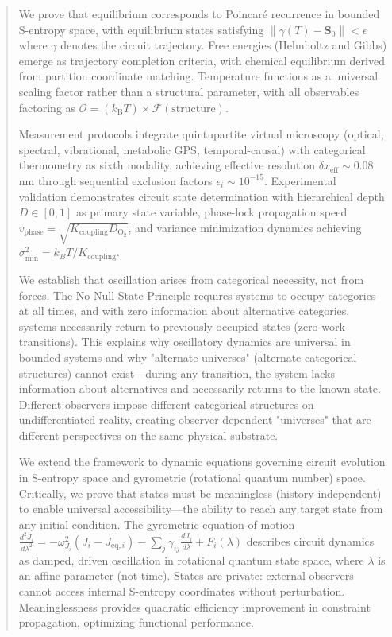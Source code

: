 \documentclass[12pt,a4paper]{article}
\theoremstyle{plain}
\theoremstyle{definition}
\theoremstyle{remark}
\newcommand{\kB}{k_{\mathrm{B}}}
\newcommand{\Scoord}{\mathbf{S}}
\begin{document}
\begin{abstract}
We prove that equilibrium corresponds to Poincaré recurrence in bounded S-entropy space, with equilibrium states satisfying $\|\gamma(T) - \Scoord_0\| < \epsilon$ where $\gamma$ denotes the circuit trajectory. Free energies (Helmholtz and Gibbs) emerge as trajectory completion criteria, with chemical equilibrium derived from partition coordinate matching. Temperature functions as a universal scaling factor rather than a structural parameter, with all observables factoring as $\mathcal{O} = (\kB T) \times \mathcal{F}(\text{structure})$.

Measurement protocols integrate quintupartite virtual microscopy (optical, spectral, vibrational, metabolic GPS, temporal-causal) with categorical thermometry as sixth modality, achieving effective resolution $\delta x_{\text{eff}} \sim 0.08$ nm through sequential exclusion factors $\epsilon_i \sim 10^{-15}$. Experimental validation demonstrates circuit state determination with hierarchical depth $D \in [0,1]$ as primary state variable, phase-lock propagation speed $v_{\text{phase}} = \sqrt{K_{\text{coupling}} D_{\text{O}_2}}$, and variance minimization dynamics achieving $\sigma^2_{\min} = k_B T / K_{\text{coupling}}$.

We establish that oscillation arises from categorical necessity, not from forces. The No Null State Principle requires systems to occupy categories at all times, and with zero information about alternative categories, systems necessarily return to previously occupied states (zero-work transitions). This explains why oscillatory dynamics are universal in bounded systems and why "alternate universes" (alternate categorical structures) cannot exist—during any transition, the system lacks information about alternatives and necessarily returns to the known state. Different observers impose different categorical structures on undifferentiated reality, creating observer-dependent "universes" that are different perspectives on the same physical substrate.

We extend the framework to dynamic equations governing circuit evolution in S-entropy space and gyrometric (rotational quantum number) space. Critically, we prove that states must be meaningless (history-independent) to enable universal accessibility—the ability to reach any target state from any initial condition. The gyrometric equation of motion $\frac{d^2 J_i}{d\lambda^2} = -\omega_{J_i}^2 (J_i - J_{\text{eq},i}) - \sum_j \gamma_{ij} \frac{dJ_j}{d\lambda} + F_i(\lambda)$ describes circuit dynamics as damped, driven oscillation in rotational quantum state space, where $\lambda$ is an affine parameter (not time). States are private: external observers cannot access internal S-entropy coordinates without perturbation. Meaninglessness provides quadratic efficiency improvement in constraint propagation, optimizing functional performance.


\end{abstract}
\end{document}
